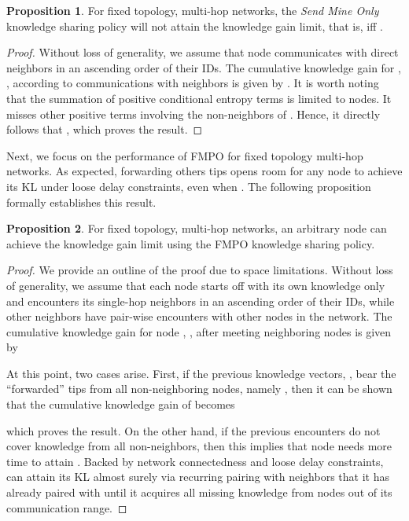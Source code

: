\documentclass[conference]{IEEEtran}
\theoremstyle{definition}
\newtheorem{prop}{Proposition}
\begin{document}
\begin{prop}
For fixed topology, multi-hop networks, the {\it Send Mine Only} knowledge sharing policy will not attain the knowledge gain limit, that is,  iff .
\end{prop}
\vspace{-0.2 cm}
\begin{proof}
Without loss of generality, we assume that node  communicates with direct neighbors in an ascending order of their IDs. The cumulative knowledge gain for , , according to communications with neighbors  is given by . It is worth noting that the summation of positive conditional entropy terms is limited to  nodes. It misses other positive terms involving the  non-neighbors of . Hence, it directly follows that , which proves the result.
\end{proof}






Next, we focus on the performance of FMPO for fixed topology multi-hop networks. As expected, forwarding others tips opens room for any node to achieve its KL under loose delay constraints, even when . The following proposition formally establishes this result. 


\begin{prop}
For fixed topology, multi-hop networks, an arbitrary node can achieve the knowledge gain limit using the FMPO knowledge sharing policy.
\end{prop}
\begin{proof}
We provide an outline of the proof due to space limitations. Without loss of generality, we assume that each node starts off with its own knowledge only and  encounters its single-hop neighbors in an ascending order of their IDs, while other neighbors have pair-wise encounters with other nodes in the network. The cumulative knowledge gain for node , , after meeting neighboring nodes  is given by



At this point, two cases arise. First, if the previous knowledge vectors, , bear the ``forwarded'' tips from all non-neighboring nodes, namely , then it can be shown that the cumulative knowledge gain of  becomes
 
\noindent which proves the result. On the other hand, if the previous encounters do not cover knowledge from all non-neighbors, then this implies that node  needs more time to attain . Backed by network connectedness and loose delay constraints,  can attain its KL almost surely via recurring pairing with neighbors that it has already paired with until it acquires all missing knowledge from nodes out of its communication range. 
\end{proof}
\end{document}
